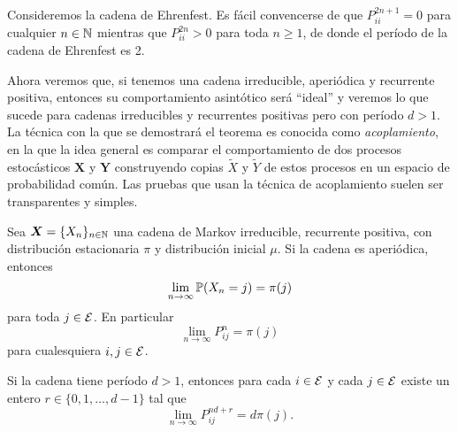 \begin{example}
    Consideremos la cadena de Ehrenfest. Es fácil convencerse de que $P_{ii}^{2n+1} = 0$ para cualquier $n \in \mathbb{N}$ mientras que $P_{ii}^{2n} > 0$ para toda $n \geq 1$, de donde el período de la cadena de Ehrenfest es 2.
\end{example}

Ahora veremos que, si tenemos una cadena irreducible, aperiódica y recurrente positiva, entonces su comportamiento asintótico será ``ideal'' y veremos lo que sucede para cadenas irreducibles y recurrentes positivas pero con período $d > 1$. La técnica con la que se demostrará el teorema es conocida como \emph{acoplamiento}, en la que la idea general es comparar el comportamiento de dos procesos estocásticos $\bm X$ y $\bm Y$ construyendo copias $\tilde X$ y $\tilde Y$ de estos procesos en un espacio de probabilidad común. Las pruebas que usan la técnica de acoplamiento suelen ser transparentes y simples.

\begin{theorem} \label{teo:convergencia distribucion estacionaria}
    Sea $\bm X = \{X_n\}_{n \in \mathbb{N}}$ una cadena de Markov irreducible, recurrente positiva, con distribución estacionaria $\pi$ y distribución inicial $\mu$. Si la cadena es aperiódica, entonces 
    \begin{equation}
        \lim_{n \to \infty} \mathbb{P}(X_n = j) = \pi(j) \label{eq:convergencia dist a est 1}
    \end{equation}
    para toda $j \in \mathcal{E}$. En particular
    \begin{equation}
        \lim_{n \to \infty} P_{ij}^n = \pi(j) \label{eq:convergencia trans a est 1}
    \end{equation}
    para cualesquiera $i, j \in \mathcal{E}$.

    Si la cadena tiene período $d > 1$, entonces para cada $i \in \mathcal{E}$ y cada $j \in \mathcal{E}$ existe un entero $r \in \{0, 1, \ldots, d-1\}$ tal que 
    \begin{equation}
        \lim_{n \to \infty} P_{ij}^{nd+r} = d\pi(j). \label{eq:convergencia trans a est 2}
    \end{equation}
\end{theorem}

